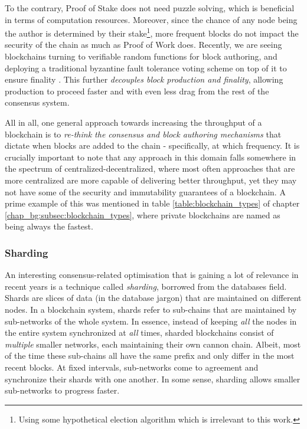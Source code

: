 To the contrary, Proof of Stake does not need puzzle solving, which is beneficial in terms of
computation resources. Moreover, since the chance of any node being the author is determined by
their stake\footnote{Using some hypothetical election algorithm which is irrelevant to this work.},
more frequent blocks do not impact the security of the chain as much as Proof of Work does.
Recently, we are seeing blockchains turning to verifiable random functions
\cite{dodisVerifiableRandomFunction2005} for block authoring, and deploying a traditional byzantine
fault tolerance voting scheme on top of it to ensure finality
\cite{buterinCasperFriendlyFinality2019, stewartPosterGRANDPAFinality2019}. This further
\textit{decouples block production and finality}, allowing production to proceed faster and with
even less drag from the rest of the consensus system.

All in all, one general approach towards increasing the throughput of a blockchain is to
\textit{re-think the consensus and block authoring mechanisms} that dictate when blocks are added to
the chain - specifically, at which frequency. It is crucially important to note that any approach in
this domain falls somewhere in the spectrum of centralized-decentralized, where most often
approaches that are more centralized are more capable of delivering better throughput, yet they may
not have some of the security and immutability guarantees of a blockchain. A prime example of this
was mentioned in table \ref{table:blockchain_types} of chapter
\ref{chap_bg:subsec:blockchain_types}, where private blockchains are named as being always the
fastest.

\subsubsection{Sharding}
An interesting consensus-related optimisation that is gaining a lot of relevance in recent years is
a technique called \textit{sharding}, borrowed from the databases field. Shards are slices of data
(in the database jargon) that are maintained on different nodes. In a blockchain system, shards
refer to sub-chains that are maintained by sub-networks of the whole system. In essence, instead of
keeping \textit{all} the nodes in the entire system synchronized at \textit{all} times, sharded
blockchains consist of \textit{multiple} smaller networks, each maintaining their own cannon chain.
Albeit, most of the time these sub-chains all have the same prefix and only differ in the most
recent blocks. At fixed intervals, sub-networks come to agreement and synchronize their shards with
one another. In some sense, sharding allows smaller sub-networks to progress
faster\cite{forestierBlockcliqueScalingBlockchains2019, al-bassamChainspaceShardedSmart2017,
shreyDiPETransFrameworkDistributed2019}.

